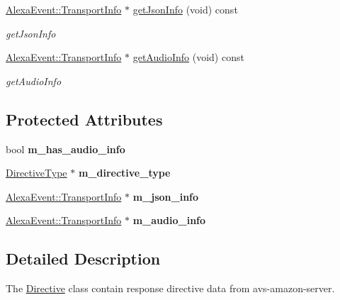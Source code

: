 \begin{DoxyCompactItemize}
\hyperlink{classAlexaEvent_1_1TransportInfo}{Alexa\+Event\+::\+Transport\+Info} $\ast$ \hyperlink{classdirective_1_1Directive_a026cf59dfe62697996942ca06f859158}{get\+Json\+Info} (void) const
\begin{DoxyCompactList}\small\item\em get\+Json\+Info \end{DoxyCompactList}\item 
\hyperlink{classAlexaEvent_1_1TransportInfo}{Alexa\+Event\+::\+Transport\+Info} $\ast$ \hyperlink{classdirective_1_1Directive_a4ba0bb73e9db8c21061c4f102e49bfcb}{get\+Audio\+Info} (void) const
\begin{DoxyCompactList}\small\item\em get\+Audio\+Info \end{DoxyCompactList}\end{DoxyCompactItemize}
\subsection*{Protected Attributes}
\begin{DoxyCompactItemize}
\item 
\mbox{\label{classdirective_1_1Directive_a9eae623c460cac1533c8a1d158283cb7}} 
bool {\bfseries m\+\_\+has\+\_\+audio\+\_\+info}
\item 
\mbox{\label{classdirective_1_1Directive_acbc877a152bd0798c30b53fe672f136d}} 
\hyperlink{classdirective_1_1DirectiveType}{Directive\+Type} $\ast$ {\bfseries m\+\_\+directive\+\_\+type}
\item 
\mbox{\label{classdirective_1_1Directive_ab0cd5bcb27e264f0a45607a36ed8964b}} 
\hyperlink{classAlexaEvent_1_1TransportInfo}{Alexa\+Event\+::\+Transport\+Info} $\ast$ {\bfseries m\+\_\+json\+\_\+info}
\item 
\mbox{\label{classdirective_1_1Directive_a5b6756b4af7e247449e03c3ab9eca864}} 
\hyperlink{classAlexaEvent_1_1TransportInfo}{Alexa\+Event\+::\+Transport\+Info} $\ast$ {\bfseries m\+\_\+audio\+\_\+info}
\end{DoxyCompactItemize}


\subsection{Detailed Description}
The \hyperlink{classdirective_1_1Directive}{Directive} class contain response directive data from avs-\/amazon-\/server. 

